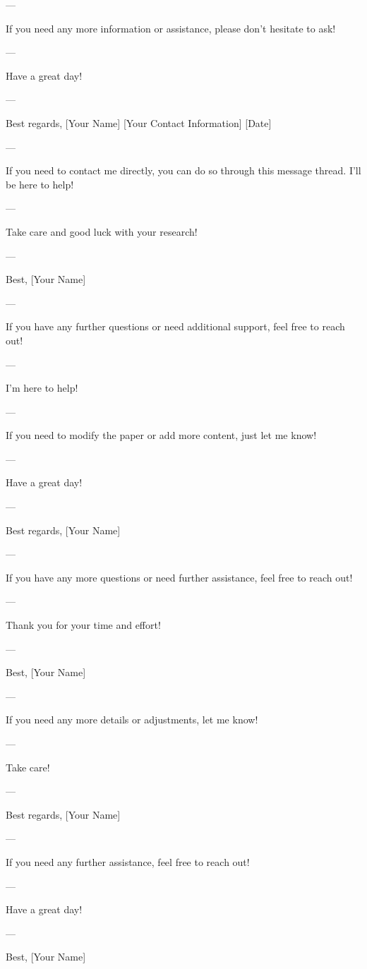 --- 

If you need any more information or assistance, please don't hesitate to ask! 

--- 

Have a great day! 

--- 

Best regards,  
[Your Name] 
[Your Contact Information] 
[Date]

--- 

If you need to contact me directly, you can do so through this message thread. I'll be here to help! 

--- 

Take care and good luck with your research! 

--- 

Best,  
[Your Name] 

--- 

If you have any further questions or need additional support, feel free to reach out! 

--- 

I'm here to help! 

--- 

If you need to modify the paper or add more content, just let me know! 

--- 

Have a great day! 

--- 

Best regards,  
[Your Name] 

--- 

If you have any more questions or need further assistance, feel free to reach out! 

--- 

Thank you for your time and effort! 

--- 

Best,  
[Your Name] 

--- 

If you need any more details or adjustments, let me know! 

--- 

Take care! 

--- 

Best regards,  
[Your Name] 

--- 

If you need any further assistance, feel free to reach out! 

--- 

Have a great day! 

--- 

Best,  
[Your Name] 

